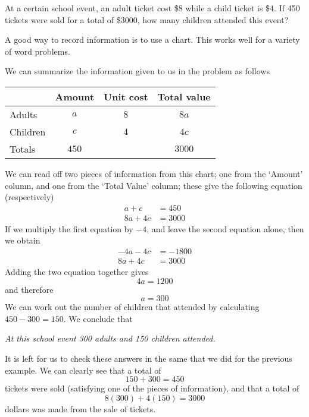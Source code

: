 \begin{myexample}
At a certain school event, an adult ticket cost \$8 while a child ticket is \$4. If 450 tickets were sold for a total of \$3000, how many
children attended this event?
\end{myexample}
\begin{myProof}
	A good way to record information is to use a chart. This works well for a variety of
	word problems. 
		
	We can summarize the information given to us in the problem as follows
	\begin{tightcenter}
		\begin{tabular}{lccc}
			\toprule
			         & Amount & Unit cost & Total value \\ 
			\midrule
			Adults   & $a$    & $8$       & $8a$        \\
			Children & $c$    & $4$       & $4c$        \\
			Totals   & $450$  &           & $3000$      \\
			\bottomrule
		\end{tabular}
	\end{tightcenter}
	We can read off two pieces of information from this chart; one from the `Amount' column, and one
	from the `Total Value' column; these give the following equation (respectively)
	\begin{align*}
		a+c   & =		450  \\
		8a+4c & =		3000 
	\end{align*}
	If we multiply the first equation by $-4$, and leave the second equation alone, then
	we obtain
	\begin{align*}
		-4a-4c & =		-1800 \\
		8a+4c  & =		3000  
	\end{align*}
	Adding the two equation together gives
	\[
		4a = 1200
	\]	
	and therefore 
	\[
		a = 300
	\]
	We can work out the number of children that attended by calculating $450-300=150$. We conclude
	that
	\begin{tightcenter}
		{\em At this school event 300 adults and 150 children attended.}
	\end{tightcenter}
	It is left for us to check these answers in the same that we did for the previous example. We
	can clearly see that a total of
	\[
		150+300=450
	\]
	tickets were sold (satisfying one of the pieces of information), and that a total of
	\[
		8(300)+4(150)=3000
	\]
	dollars was made from the sale of tickets.
\end{myProof}


